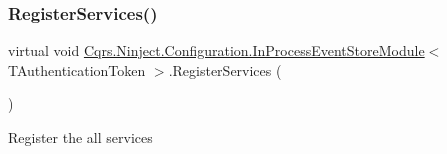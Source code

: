 \subsubsection{\texorpdfstring{Register\+Services()}{RegisterServices()}}
{\footnotesize\ttfamily virtual void \hyperlink{classCqrs_1_1Ninject_1_1Configuration_1_1InProcessEventStoreModule}{Cqrs.\+Ninject.\+Configuration.\+In\+Process\+Event\+Store\+Module}$<$ T\+Authentication\+Token $>$.Register\+Services (\begin{DoxyParamCaption}{ }\end{DoxyParamCaption})\hspace{0.3cm}{\ttfamily [virtual]}}



Register the all services 

